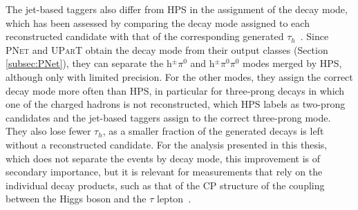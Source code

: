 The jet-based taggers also differ from HPS in the assignment of the decay mode, which has been assessed by comparing the decay mode assigned to each reconstructed candidate with that of the corresponding generated $\tau_h$~\cite{CMS-DP-2025-073}. Since \textsc{PNet} and \textsc{UParT} obtain the decay mode from their output classes (Section \ref{subsec:PNet}), they can separate the h$^{\pm}\pi^0$ and h$^{\pm}\pi^0\pi^0$ modes merged by HPS, although only with limited precision. For the other modes, they assign the correct decay mode more often than HPS, in particular for three-prong decays in which one of the charged hadrons is not reconstructed, which HPS labels as two-prong candidates and the jet-based taggers assign to the correct three-prong mode. They also lose fewer $\tau_h$, as a smaller fraction of the generated decays is left without a reconstructed candidate. For the analysis presented in this thesis, which does not separate the events by decay mode, this improvement is of secondary importance, but it is relevant for measurements that rely on the individual decay products, such as that of the CP structure of the coupling between the Higgs boson and the $\tau$ lepton~\cite{CMS-HIG-20-006}.\medskip





